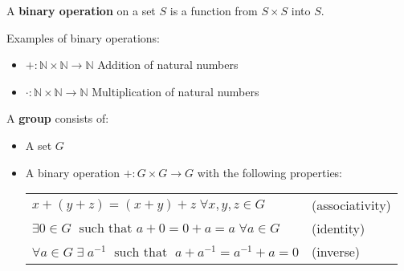 \begin{definition*} A \textbf{binary operation} on a set $S$ is a function from $S\times S$ into $S$.
\par\vspace{0.3 cm}
Examples of binary operations:
\begin{itemize} 
\item $+:\mathbb{N}\times\mathbb{N} \rightarrow \mathbb{N}$ Addition of natural numbers
\item $\cdot : \mathbb{N}\times\mathbb{N} \rightarrow \mathbb{N}$ Multiplication of natural numbers
\end{itemize}
\par
\end{definition*}
\par\vspace{1 cm}
\begin{definition*}[group] A \textbf{group} consists of:
\begin{itemize} 
\item A set $G$
\item A binary operation $+ : G\times G\rightarrow G$ with the following properties:
\par
\begin{tabular}{ll}
$x+(y+z)=(x+y)+z\;\forall x,y,z\in G$ & (associativity)\\
$\exists 0\in G\;\mbox{ such that } a+0=0+a=a\;\forall a\in G$ & (identity)\\
$\forall a\in G\;\exists\;a^{-1}\;\mbox{ such that }\; a+a^{-1}=a^{-1}+a=0$ & (inverse)\\ 
\end{tabular}
\end{itemize}
\end{definition*}
\par\vspace{1 cm}
